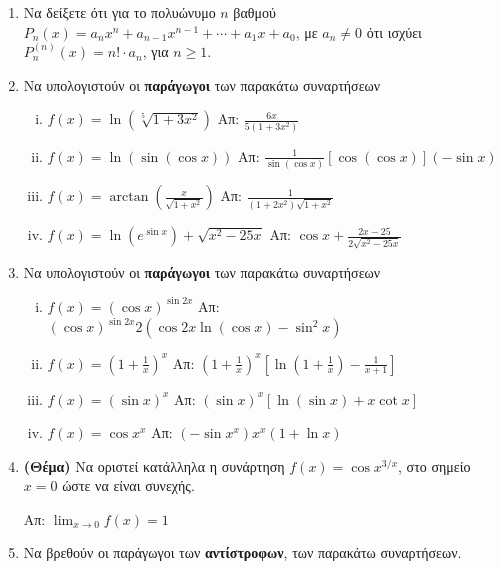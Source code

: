 \begin{enumerate}
  \item Να δείξετε ότι για το πολυώνυμο $n$ βαθμού $ P_{n}(x) =a_{n}x^{n} +
    a_{n-1}x^{n-1} + \cdots + a_{1}x + a_{0} $, με  $ a_{n}\neq 0 $ ότι ισχύει $
    P_{n}^{(n)}(x) = n! \cdot a_{n}$, για  $n\geq 1 $.

  \item Να υπολογιστούν οι \textbf{παράγωγοι} των παρακάτω συναρτήσεων
    \begin{enumerate}[(i)]
      \item $ f(x) = \ln{\left(\sqrt[5]{1+3x^{2}}\right)} $ \hfill Απ: $
        \frac{6x}{5(1+3x^{2})} $
      \item $ f(x) = \ln({\sin({\cos{x}})}) $ \hfill Απ: $
        \frac{1}{\sin{(\cos{x})}} [\cos{(\cos{x})}] (- \sin{x}) $ 
      \item $ f(x) = \arctan{\left(\frac{x}{\sqrt{1 + x^{2}}}\right)} $ \hfill Απ: $
        \frac{1}{(1+2x^{2})\sqrt{1 + x^{2}}} $
      \item $ f(x) = \ln{(e^{\sin{x}})} + \sqrt{x^{2} - 25x} $ \hfill Απ: $
        \cos{x} + \frac{2x - 25}{2 \sqrt{x^{2} - 25x}}  $  
    \end{enumerate}

  \item  Να υπολογιστούν οι \textbf{παράγωγοι} των παρακάτω συναρτήσεων

    \begin{enumerate}[(i)]
      \item $ f(x) = (\cos{x})^{\sin{2x}} $ \hfill Απ: $
        (\cos{x})^{\sin{2x}} 2(\cos{2x} \ln{(\cos{x})} - \sin^{2}{x}) $
      \item $ f(x) = \left(1 + \frac{1}{x} \right)^{x} $ \hfill Απ: $
        \left(1 + \frac{1}{x}\right)^{x}\left[\ln{(1 + \frac{1}{x})} -
        \frac{1}{x+1}\right] $
      \item $ f(x)=(\sin{x})^{x} $ \hfill Απ: $ (\sin{x})^{x}[\ln{(\sin{x}
        )} + x \cot{x}] $ 
      \item $ f(x)=\cos{x}^{x} $ \hfill Απ: $ (- \sin{x^{x}})x^{x} (1 +
        \ln{x}) $
    \end{enumerate}

  \item \textbf{(Θέμα)} Να οριστεί κατάλληλα η συνάρτηση $ f(x)= \cos{x}^{3/x} $, στο 
    σημείο $ x=0 $ ώστε να είναι συνεχής.

    \hfill Απ: $ \lim_{x \to 0} f(x)=1 $  

  \item Να βρεθούν οι παράγωγοι των \textbf{αντίστροφων}, των παρακάτω συναρτήσεων.


\end{enumerate}
